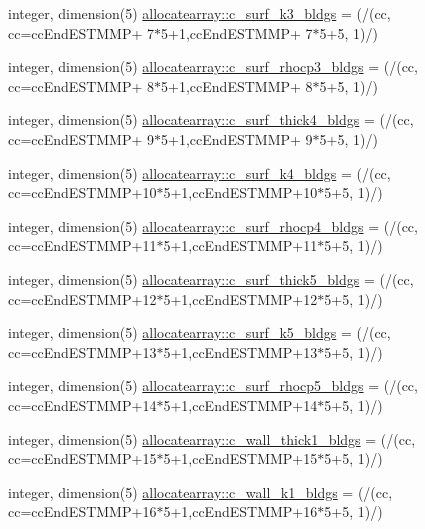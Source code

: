 \begin{DoxyCompactItemize}
\item 
integer, dimension(5) \hyperlink{namespaceallocatearray_a0dde0883f6fd035daedd64579708e13d}{allocatearray\+::c\+\_\+surf\+\_\+k3\+\_\+bldgs} = (/(cc, cc=cc\+End\+E\+S\+T\+M\+MP+ 7$\ast$5+1,cc\+End\+E\+S\+T\+M\+MP+ 7$\ast$5+5, 1)/)
\item 
integer, dimension(5) \hyperlink{namespaceallocatearray_aef54fff4822161f28c6c3da862df5520}{allocatearray\+::c\+\_\+surf\+\_\+rhocp3\+\_\+bldgs} = (/(cc, cc=cc\+End\+E\+S\+T\+M\+MP+ 8$\ast$5+1,cc\+End\+E\+S\+T\+M\+MP+ 8$\ast$5+5, 1)/)
\item 
integer, dimension(5) \hyperlink{namespaceallocatearray_ac2194bcb7399903732a361af05dd38b7}{allocatearray\+::c\+\_\+surf\+\_\+thick4\+\_\+bldgs} = (/(cc, cc=cc\+End\+E\+S\+T\+M\+MP+ 9$\ast$5+1,cc\+End\+E\+S\+T\+M\+MP+ 9$\ast$5+5, 1)/)
\item 
integer, dimension(5) \hyperlink{namespaceallocatearray_ab35400b9c31346e3dd010b2e83f542be}{allocatearray\+::c\+\_\+surf\+\_\+k4\+\_\+bldgs} = (/(cc, cc=cc\+End\+E\+S\+T\+M\+MP+10$\ast$5+1,cc\+End\+E\+S\+T\+M\+MP+10$\ast$5+5, 1)/)
\item 
integer, dimension(5) \hyperlink{namespaceallocatearray_a35c52b98a58d78f88b187f33aed86b06}{allocatearray\+::c\+\_\+surf\+\_\+rhocp4\+\_\+bldgs} = (/(cc, cc=cc\+End\+E\+S\+T\+M\+MP+11$\ast$5+1,cc\+End\+E\+S\+T\+M\+MP+11$\ast$5+5, 1)/)
\item 
integer, dimension(5) \hyperlink{namespaceallocatearray_aa1c4374aa923231385e3fa68751e42a0}{allocatearray\+::c\+\_\+surf\+\_\+thick5\+\_\+bldgs} = (/(cc, cc=cc\+End\+E\+S\+T\+M\+MP+12$\ast$5+1,cc\+End\+E\+S\+T\+M\+MP+12$\ast$5+5, 1)/)
\item 
integer, dimension(5) \hyperlink{namespaceallocatearray_a746e5ac0eb74cd9430f4a2b86879b70a}{allocatearray\+::c\+\_\+surf\+\_\+k5\+\_\+bldgs} = (/(cc, cc=cc\+End\+E\+S\+T\+M\+MP+13$\ast$5+1,cc\+End\+E\+S\+T\+M\+MP+13$\ast$5+5, 1)/)
\item 
integer, dimension(5) \hyperlink{namespaceallocatearray_a32c00f0a86e011490cbd416daad75789}{allocatearray\+::c\+\_\+surf\+\_\+rhocp5\+\_\+bldgs} = (/(cc, cc=cc\+End\+E\+S\+T\+M\+MP+14$\ast$5+1,cc\+End\+E\+S\+T\+M\+MP+14$\ast$5+5, 1)/)
\item 
integer, dimension(5) \hyperlink{namespaceallocatearray_a1061e11bf9a6d6a6a63b9388a8a43270}{allocatearray\+::c\+\_\+wall\+\_\+thick1\+\_\+bldgs} = (/(cc, cc=cc\+End\+E\+S\+T\+M\+MP+15$\ast$5+1,cc\+End\+E\+S\+T\+M\+MP+15$\ast$5+5, 1)/)
\item 
integer, dimension(5) \hyperlink{namespaceallocatearray_a1777db63886a4bf072822bbc13c75d48}{allocatearray\+::c\+\_\+wall\+\_\+k1\+\_\+bldgs} = (/(cc, cc=cc\+End\+E\+S\+T\+M\+MP+16$\ast$5+1,cc\+End\+E\+S\+T\+M\+MP+16$\ast$5+5, 1)/)

\end{DoxyCompactItemize}
